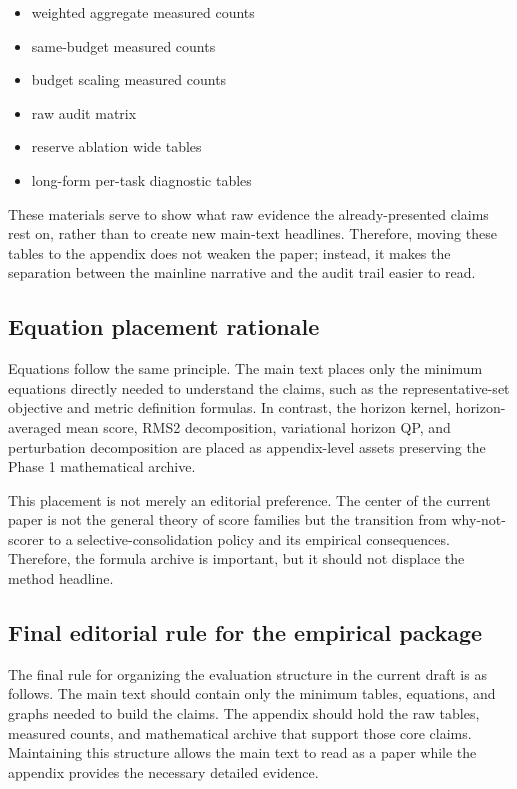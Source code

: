 \begin{itemize}
\item weighted aggregate measured counts
\item same-budget measured counts
\item budget scaling measured counts
\item raw audit matrix
\item reserve ablation wide tables
\item long-form per-task diagnostic tables
\end{itemize}


These materials serve to show what raw evidence the already-presented claims rest on, rather than to create new main-text headlines. Therefore, moving these tables to the appendix does not weaken the paper; instead, it makes the separation between the mainline narrative and the audit trail easier to read.


\subsection{Equation placement rationale}


Equations follow the same principle. The main text places only the minimum equations directly needed to understand the claims, such as the representative-set objective and metric definition formulas. In contrast, the horizon kernel, horizon-averaged mean score, RMS2 decomposition, variational horizon QP, and perturbation decomposition are placed as appendix-level assets preserving the Phase 1 mathematical archive.


This placement is not merely an editorial preference. The center of the current paper is not the general theory of score families but the transition from why-not-scorer to a selective-consolidation policy and its empirical consequences. Therefore, the formula archive is important, but it should not displace the method headline.


\subsection{Final editorial rule for the empirical package}


The final rule for organizing the evaluation structure in the current draft is as follows. The main text should contain only the minimum tables, equations, and graphs needed to build the claims. The appendix should hold the raw tables, measured counts, and mathematical archive that support those core claims. Maintaining this structure allows the main text to read as a paper while the appendix provides the necessary detailed evidence.



